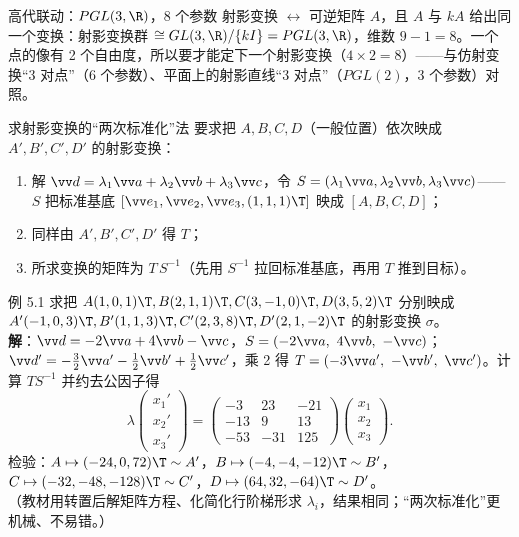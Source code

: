 \begin{gdbox}{高代联动：$PGL(3,\R)$，8 个参数}
射影变换 $\leftrightarrow$ 可逆矩阵 $A$，且 $A$ 与 $kA$ 给出同一个变换：射影变换群 $\cong GL(3,\R)/\{kI\}=PGL(3,\R)$，维数 $9-1=8$。一个点的像有 2 个自由度，所以要才能定下一个射影变换（$4\times2=8$）——与仿射变换“3 对点”（$6$ 个参数）、平面上的射影直线“3 对点”（$PGL(2)$，3 个参数）对照。
\end{gdbox}

\begin{mtbox}{求射影变换的“两次标准化”法}
要求把 $A,B,C,D$（一般位置）依次映成 $A',B',C',D'$ 的射影变换：
\begin{enumerate}
\item 解 $\vv d=\lambda_1\vv a+\lambda_2\vv b+\lambda_3\vv c$，令 $S=(\lambda_1\vv a,\lambda_2\vv b,\lambda_3\vv c)$——$S$ 把标准基底 $[\vv e_1,\vv e_2,\vv e_3,(1,1,1)\T]$ 映成 $[A,B,C,D]$；
\item 同样由 $A',B',C',D'$ 得 $T$；
\item 所求变换的矩阵为 $T\,S^{-1}$（先用 $S^{-1}$ 拉回标准基底，再用 $T$ 推到目标）。
\end{enumerate}
\end{mtbox}

\begin{mtbox}{例 5.1}
求把 $A(1,0,1)\T,B(2,1,1)\T,C(3,-1,0)\T,D(3,5,2)\T$ 分别映成 $A'(-1,0,3)\T,B'(1,1,3)\T,C'(2,3,8)\T,D'(2,1,-2)\T$ 的射影变换 $\sigma$。\\[2pt]
\textbf{解}：$\vv d=-2\vv a+4\vv b-\vv c$，$S=(-2\vv a,\ 4\vv b,\ -\vv c)$；$\vv d'=-\frac32\vv a'-\frac12\vv b'+\frac12\vv c'$，乘 2 得 $T=(-3\vv a',\ -\vv b',\ \vv c')$。计算 $TS^{-1}$ 并约去公因子得
\[
\lambda\begin{pmatrix}x_1'\\x_2'\\x_3'\end{pmatrix}=\begin{pmatrix}-3&23&-21\\-13&9&13\\-53&-31&125\end{pmatrix}\begin{pmatrix}x_1\\x_2\\x_3\end{pmatrix}.
\]
检验：$A\mapsto(-24,0,72)\T\sim A'$，$B\mapsto(-4,-4,-12)\T\sim B'$，$C\mapsto(-32,-48,-128)\T\sim C'$，$D\mapsto(64,32,-64)\T\sim D'$。\checkmark\\
（教材用转置后解矩阵方程、化简化行阶梯形求 $\lambda_i$，结果相同；“两次标准化”更机械、不易错。）
\end{mtbox}

